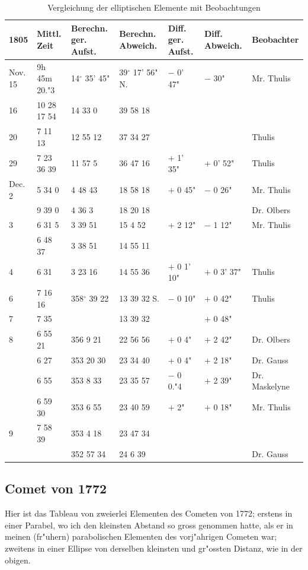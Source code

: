 \documentclass[12pt,a4paper]{article}
\begin{document}
\begin{table}[H]
\centering
\begin{tabular}{l l l l l l l}
\toprule
1805 & Mittl. Zeit & Berechn. ger. Aufst. & Berechn. Abweich. & Diff. ger. Aufst. & Diff. Abweich. & Beobachter \\
\midrule
Nov. 15 & 9h 45m 20."3 & 14$^\circ$ 35' 45" & 39$^\circ$ 17' 56" N. & $-$ 0' 47" & $-$ 30" & Mr. Thulis \\
16 & 10 28 17 54 & 14 33 0 & 39 58 18 & & & \\
20 & 7 11 13 & 12 55 12 & 37 34 27 & & & Thulis \\
29 & 7 23 36 39 & 11 57 5 & 36 47 16 & $+$ 1' 35" & $+$ 0' 52" & Thulis \\
Dec. 2 & 5 34 0 & 4 48 43 & 18 58 18 & $+$ 0 45" & $-$ 0 26" & Mr. Thulis \\
& 9 39 0 & 4 36 3 & 18 20 18 & & & Dr. Olbers \\
3 & 6 31 5 & 3 39 51 & 15 4 52 & $+$ 2 12" & $-$ 1 12" & Mr. Thulis \\
& 6 48 37 & 3 38 51 & 14 55 11 & & & \\
4 & 6 31 & 3 23 16 & 14 55 36 & $+$ 0 1' 10" & $+$ 0 3' 37" & Thulis \\
6 & 7 16 16 & 358$^\circ$ 39 22 & 13 39 32 S. & $-$ 0 10" & $+$ 0 42" & Thulis \\
7 & 7 35 & & 13 39 32 & & $+$ 0 48" & \\
8 & 6 55 21 & 356 9 21 & 22 56 56 & $+$ 0 4" & $+$ 2 42" & Dr. Olbers \\
& 6 27 & 353 20 30 & 23 34 40 & $+$ 0 4" & $+$ 2 18" & Dr. Gauss \\
& 6 55 & 353 8 33 & 23 35 57 & $-$ 0 0."4 & $+$ 2 39" & Dr. Maskelyne \\
& 6 59 30 & 353 6 55 & 23 40 59 & $+$ 2" & $+$ 0 18" & Mr. Thulis \\
9 & 7 58 39 & 353 4 18 & 23 47 34 & & & \\
& & 352 57 34 & 24 6 39 & & & Dr. Gauss \\
\bottomrule
\end{tabular}
\caption{Vergleichung der elliptischen Elemente mit Beobachtungen}
\end{table}

\subsection{Comet von 1772}

Hier ist das Tableau von zweierlei Elementen des Cometen von 1772; erstens in einer Parabel, wo ich den kleinsten Abstand so gross genommen hatte, als er in meinen (fr"uhern) parabolischen Elementen des vorj"ahrigen Cometen war; zweitens in einer Ellipse von derselben kleinsten und gr"ossten Distanz, wie in der obigen.
\end{document}
